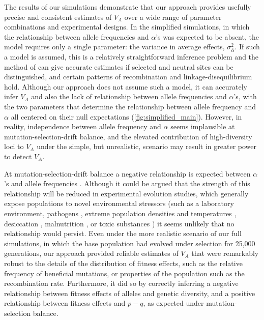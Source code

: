 \documentclass[12pt]{article}
\begin{document}
\begin{bibunit}
The results of our simulations demonstrate that our approach provides usefully precise and consistent estimates of $V_A$ over a wide range of parameter combinations and experimental designs. In the simplified simulations, in which the relationship between allele frequencies and $\alpha$'s was expected to be absent, the model requires only a single parameter: the variance in average effects, $\sigma^2_{\bar{\alpha}}$. If such a model is assumed, this is a relatively straightforward inference problem and the method of \citet{buffalo2019linked} can give accurate estimates if selected and neutral sites can be distinguished, and certain patterns of recombination and linkage-disequilibrium hold.  Although our approach does not assume such a model, it can accurately infer $V_A$ and also the lack of relationship between allele frequencies and $\alpha$'s, with the two parameters that determine the relationship between allele frequency and $\alpha$ all centered on their null expectations (\ref{fig:simplified_main}). However, in reality, independence between allele frequency and $\alpha$ seems implausible at mutation-selection-drift balance, and the elevated contribution of high-diversity loci to $V_A$ under the simple, but unrealistic, scenario may result in greater power to detect $V_A$.

At mutation-selection-drift balance a negative relationship is expected between $\alpha$'s and allele frequencies \citep{Charlesworth.2010}. Although it could be argued that the strength of this relationship will be reduced in experimental evolution studies, which generally expose populations to novel environmental stressors (such as a laboratory environment, pathogens \citep{basu2024experimental}, extreme population densities \citep{joshi1996density} and temperatures \citep{singh2015egg, hsu2024reproductive}, desiccation \citep{gibbs1997physiological}, malnutrition \citep{kawecki2021genomic}, or toxic substances \citep{godinho2024limits, xiao2019experimental}) it seems unlikely that no relationship would persist. Even under the more realistic scenario of our full simulations, in which the base population had evolved under selection for 25,000 generations, our approach provided reliable estimates of $V_A$ that were remarkably robust to the details of the distribution of fitness effects, such as the relative frequency of beneficial mutations, or properties of the population such as the recombination rate. Furthermore, it did so by correctly inferring a negative relationship between fitness effects of alleles and genetic diversity, and a positive relationship between fitness effects and $p-q$, as expected under mutation-selection balance.


\end{bibunit}
\end{document}
